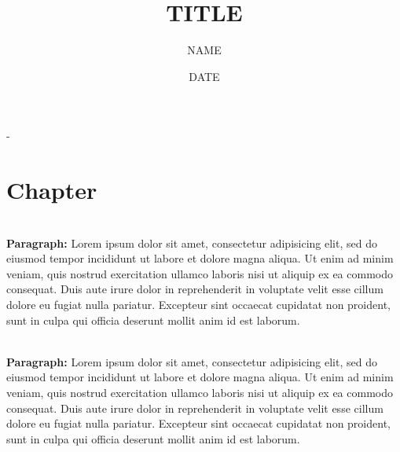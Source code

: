 \documentclass[a5paper, 10pt]{book}
\title{TITLE}
\author{NAME}
\date{DATE}
\newif\ifBgUse
\renewcommand\maketitle[0]{
\begin{center}
	\fontsize{20pt}{20pt}\selectfont
	\textbf{\thetitle}
\end{center}
\begin{center}
	\vspace{1.25em}
	\fontsize{10pt}{10pt}\selectfont
	\theauthor \hspace{0.5cm} - \hspace{0.5cm} \thedate
\end{center}

\fontsize{11pt}{11pt}\selectfont

\tableofcontents
}
\renewcommand{\paragraph}[1]{\mbox{}\\ \textbf{#1:} \hspace{0.15em}}
\begin{document}

    \linespread{1}
	\graphicspath{ {./img/} }


	\BgUsefalse

    \maketitle



	\chapter{Chapter}
	\BgUsetrue

	\paragraph{Paragraph} Lorem ipsum dolor sit amet, consectetur adipisicing elit, sed do eiusmod tempor incididunt ut labore et dolore magna aliqua. Ut enim ad minim veniam, quis nostrud exercitation ullamco laboris nisi ut aliquip ex ea commodo consequat. Duis aute irure dolor in reprehenderit in voluptate velit esse cillum dolore eu fugiat nulla pariatur. Excepteur sint occaecat cupidatat non proident, sunt in culpa qui officia deserunt mollit anim id est laborum.

	\paragraph{Paragraph} Lorem ipsum dolor sit amet, consectetur adipisicing elit, sed do eiusmod tempor incididunt ut labore et dolore magna aliqua. Ut enim ad minim veniam, quis nostrud exercitation ullamco laboris nisi ut aliquip ex ea commodo consequat. Duis aute irure dolor in reprehenderit in voluptate velit esse cillum dolore eu fugiat nulla pariatur. Excepteur sint occaecat cupidatat non proident, sunt in culpa qui officia deserunt mollit anim id est laborum.
\end{document}
